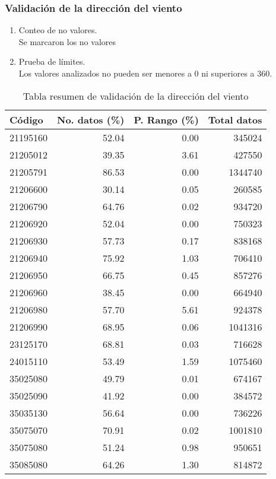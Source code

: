 \documentclass[11pt]{article}
\begin{document}
\subsubsection{Validación de la dirección del viento}

\begin{enumerate}
\item Conteo de no valores.\\
Se marcaron los no valores

\item Prueba de límites.\\
Los valores analizados no pueden ser menores a 0 ni superiores a 360.
\end{enumerate}

\begin{table}[H]
\begin{center}


\begin{tabular}{lrrr}
\toprule
      Código &  No. datos  (\%)&  P. Rango  (\%)& Total datos \\
\midrule
 21195160 &      52.04 &      0.00 &        345024 \\
 21205012 &      39.35 &      3.61 &        427550 \\
 21205791 &      86.53 &      0.00 &       1344740 \\
 21206600 &      30.14 &      0.05 &        260585 \\
 21206790 &      64.76 &      0.02 &        934720 \\
 21206920 &      52.04 &      0.00 &        750323 \\
 21206930 &      57.73 &      0.17 &        838168 \\
 21206940 &      75.92 &      1.03 &        706410 \\
 21206950 &      66.75 &      0.45 &        857276 \\
 21206960 &      38.45 &      0.00 &        664940 \\
 21206980 &      57.70 &      5.61 &        924378 \\
 21206990 &      68.95 &      0.06 &       1041316 \\
 23125170 &      68.81 &      0.03 &        716628 \\
 24015110 &      53.49 &      1.59 &       1075460 \\
 35025080 &      49.79 &      0.01 &        674167 \\
 35025090 &      41.92 &      0.00 &        384572 \\
 35035130 &      56.64 &      0.00 &        736226 \\
 35075070 &      70.91 &      0.02 &       1001810 \\
 35075080 &      51.24 &      0.98 &        950651 \\
 35085080 &      64.26 &      1.30 &        814872 \\
\bottomrule
\end{tabular}
		\caption{Tabla resumen de validación de la dirección del viento}
		\label{tabla:val_dir_viento}
\end{center}
\end{table}
\end{document}
